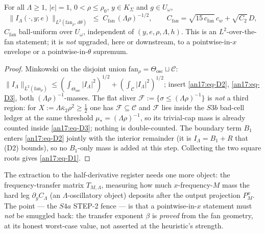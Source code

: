 \begin{proposition}
\label{an17:S4a-D1}%
\label{prop:an-D1}%
For all $\Lambda\ge1$, $|e|=1$, $0<\rho\le\rho_0$, $y\in K_\Sigma$ and
$g\in U_\omega$,
\begin{equation}\label{an17:eq-D1}
 \bigl\|I_\Lambda(\cdot,y;e)\bigr\|_{L^2(\mathrm{fan}_\rho,\,d\theta)}
 \;\le\;C_{\mathrm{fan}}\,(\Lambda\rho)^{-1/2},\qquad
 C_{\mathrm{fan}}=\sqrt{15\,c_{\mathrm{fan}}}\,c_w+\sqrt{C_2}\,D,
\end{equation}
$C_{\mathrm{fan}}$ ball-uniform over $U_\omega$, independent of
$(y,e,\rho,\Lambda,h)$. This is an $L^2$-over-the-fan statement; it is
\emph{not} upgraded, here or downstream, to a pointwise-in-$x$ envelope or a
pointwise-in-$\theta$ supremum.
\end{proposition}
\begin{proof}
Minkowski on the disjoint union $\mathrm{fan}_\rho=\Theta_{\mathrm{osc}}\sqcup
\mathcal C$:
$\|I_\Lambda\|_{L^2(\mathrm{fan}_\rho)}\le(\int_{\Theta_{\mathrm{osc}}}
|I_\Lambda|^2)^{1/2}+(\int_{\mathcal C}|I_\Lambda|^2)^{1/2}$; insert
\eqref{an17:eq-D2}, \eqref{an17:eq-D3}, both $(\Lambda\rho)^{-1}$-masses. The
flat sliver $\mathcal F:=\{\sigma\le(\Lambda\rho)^{-1}\}$ is \emph{not} a third
region: for $X:=\Lambda\bar\kappa_2\rho^2\ge\tfrac12$ one has
$\mathcal F\subseteq\mathcal C$ and $\mathcal F$ lies inside the $S3b$ bad-cell
ledger at the same threshold $\mu_*=(\Lambda\rho)^{-1}$, so its trivial-cap mass
is already counted inside \eqref{an17:eq-D3}; nothing is double-counted. The
boundary term $B_1$ enters \eqref{an17:eq-D2} jointly with the interior remainder
(it is $I_\Lambda=B_1+R$ that (D2) bounds), so no $B_1$-only mass is added at this
step. Collecting the two square roots gives \eqref{an17:eq-D1}.
\end{proof}

The extraction to the half-derivative register needs one more object: the
frequency-transfer matrix $T_{M,\Lambda}$, measuring how much $x$-frequency-$M$
mass the hard leg $\partial_yC_\Lambda$ (an $\Lambda$-oscillatory object) deposits
after the output projection $P^x_M$. The point --- the $S4a$ STEP-2 fence --- is
that a pointwise-in-$x$ statement must \emph{not} be smuggled back: the transfer
exponent $\beta$ is \emph{proved} from the fan geometry, at its honest worst-case
value, not asserted at the heuristic's strength.

